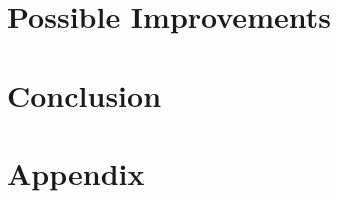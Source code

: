 \documentclass[11pt,a4paper]{book}
\begin{document}
\chapter{Possible Improvements}
\label{c:improvements}


\chapter{Conclusion}
\label{c:conclusion}

\appendix
\chapter{Appendix}
\label{c:appendix}



\end{document}
